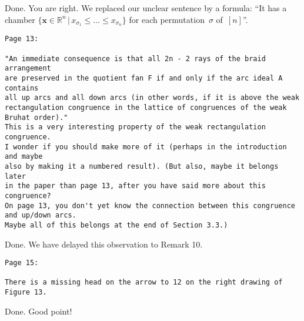 \documentclass{article}
\begin{document}
Done. You are right. We replaced our unclear sentence by a formula: ``It has a chamber $\{\boldsymbol{x} \in \mathbb{R}^n \,|\, x_{\sigma_1} \le \dots \le x_{\sigma_n}\}$ for each permutation~$\sigma$ of~$[n]$''.

\begin{verbatim}
Page 13:

"An immediate consequence is that all 2n - 2 rays of the braid arrangement 
are preserved in the quotient fan F if and only if the arc ideal A contains 
all up arcs and all down arcs (in other words, if it is above the weak 
rectangulation congruence in the lattice of congruences of the weak Bruhat order)."  
This is a very interesting property of the weak rectangulation congruence.  
I wonder if you should make more of it (perhaps in the introduction and maybe 
also by making it a numbered result). (But also, maybe it belongs later 
in the paper than page 13, after you have said more about this congruence?  
On page 13, you don't yet know the connection between this congruence and up/down arcs.  
Maybe all of this belongs at the end of Section 3.3.)
\end{verbatim}

Done. We have delayed this observation to Remark 10.

\begin{verbatim}
Page 15:  

There is a missing head on the arrow to 12 on the right drawing of Figure 13.
\end{verbatim}

Done. Good point!
\end{document}
